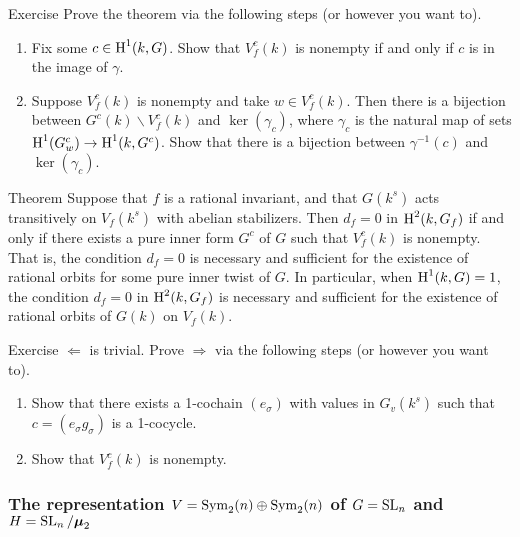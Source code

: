 \begin{enonce*}[remark]{Exercise}
Prove the theorem via the following steps (or however you want to). 
\begin{enumerate}
  \item Fix some $c\in \operatorname{H}^1(k,G)$. Show that $V_f^c(k)$ is nonempty if and only 
    if $c$ is in the image of $\gamma$. 
  \item Suppose $V_f^c(k)$ is nonempty and take $w\in V_f^c(k)$. Then there is a 
    bijection between $G^c(k)\backslash V_f^c(k)$ and $\ker(\gamma_c)$, where 
    $\gamma_c$ is the natural map of sets $\operatorname{H}^1(G_w^c)\to \operatorname{H}^1(k,G^c)$. Show 
    that there is a bijection between $\gamma^{-1}(c)$ and $\ker(\gamma_c)$. 
\end{enumerate}
\end{enonce*}

\begin{enonce*}{Theorem}
Suppose that $f$ is a rational invariant, and that $G(k^s)$ acts transitively 
on $V_f(k^s)$ with abelian stabilizers. Then $d_f=0$ in $\operatorname{H}^2(k,G_f)$ if and 
only if there exists a pure inner form $G^c$ of $G$ such that $V_f^c(k)$ is 
nonempty. That is, the condition $d_f=0$ is necessary and sufficient for the 
existence of rational orbits for some pure inner twist of $G$. In particular, 
when $\operatorname{H}^1(k,G)=1$, the condition $d_f=0$ in $\operatorname{H}^2(k,G_f)$ is necessary and 
sufficient for the existence of rational orbits of $G(k)$ on $V_f(k)$. 
\end{enonce*}

\begin{enonce*}[remark]{Exercise}
$\Leftarrow$ is trivial. Prove $\Rightarrow$ via the following steps (or 
however you want to). 
\begin{enumerate}
  \item Show that there exists a 1-cochain $(e_\sigma)$ with values in 
    $G_v(k^s)$ such that $c=(e_\sigma g_\sigma)$ is a 1-cocycle. 
  \item Show that $V_f^c(k)$ is nonempty. 
\end{enumerate}
\end{enonce*}


\subsubsection{The representation $V=\operatorname{Sym}_2(n)\oplus \operatorname{Sym}_2(n)$ of $G=\operatorname{SL}_n$ and $H=\operatorname{SL}_n/\boldsymbol\mu_2$}

